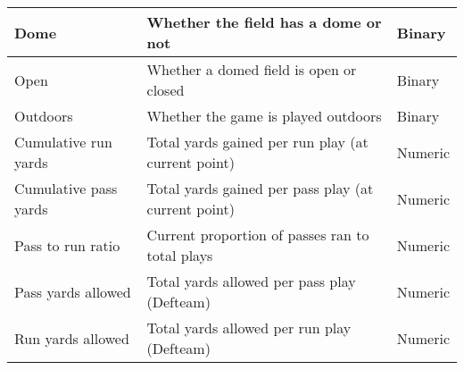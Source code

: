\documentclass[11pt]{article}
\begin{document}
\begin{table*}[ht]
\begin{tabular}{|| m{4cm} | m{10cm}| m{2cm} ||}
                \hline 
                Dome & Whether the field has a dome or not & Binary \\
                \hline 
                Open & Whether a domed field is open or closed & Binary \\
                \hline 
                Outdoors & Whether the game is played outdoors & Binary \\
                \hline 
                Cumulative run yards & Total yards gained per run play (at current point) & Numeric  \\
                \hline 
                Cumulative pass yards & Total yards gained per pass play (at current point) & Numeric \\
                \hline
                Pass to run ratio & Current proportion of passes ran to total plays & Numeric \\
                \hline
                Pass yards allowed & Total yards allowed per pass play (Defteam) & Numeric \\
                \hline
                Run yards allowed & Total yards allowed per run play (Defteam) & Numeric \\
                \hline
            \end{tabular}
            \end{table*}
        
\end{document}
